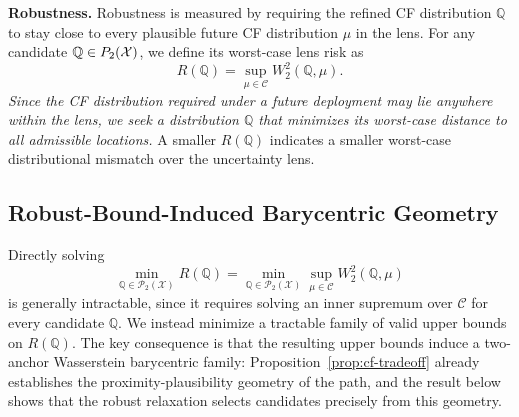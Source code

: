 \textbf{Robustness.}
Robustness is measured by requiring the refined CF distribution $\mathbb{Q}$ to stay close to every plausible future CF distribution $\mu$ in the lens. 
For any candidate $\mathbb{Q}\in\mathcal \mathcal{P}_2(\mathcal X)$, we define its worst-case lens risk as
\begin{equation}
   \label{eq:worstcaserisk}
R(\mathbb{Q})
=
\sup_{\mu\in\mathcal C}W_2^2(\mathbb{Q},\mu). 
\end{equation} 
\emph{Since the CF distribution required under a future deployment may lie anywhere within the lens, we seek a distribution $\mathbb{Q}$ that minimizes its worst-case distance to all admissible locations.}
A smaller $R(\mathbb{Q})$ indicates a smaller worst-case
distributional mismatch over the uncertainty lens.



\subsection{Robust-Bound-Induced Barycentric Geometry}\label{sec:barycentric}

Directly solving
\begin{equation}
   \label{eq:intractable_objective}
\min_{\mathbb{Q}\in  \mathcal{P}_2(\mathcal X)}
R(\mathbb{Q})
=
\min_{\mathbb{Q}\in  \mathcal{P}_2(\mathcal X)}
\sup_{\mu\in\mathcal C}W_2^2(\mathbb{Q},\mu)
\end{equation} 
is generally intractable, since it requires solving an inner supremum over $\mathcal C$ for every candidate $\mathbb{Q}$. 
We instead minimize a tractable family of valid upper bounds on $R(\mathbb{Q})$. 
The key consequence is that the resulting upper bounds induce a two-anchor Wasserstein barycentric family: Proposition~\ref{prop:cf-tradeoff} already establishes the proximity-plausibility geometry of the path, and the result below shows that the robust relaxation selects candidates precisely from this geometry.


